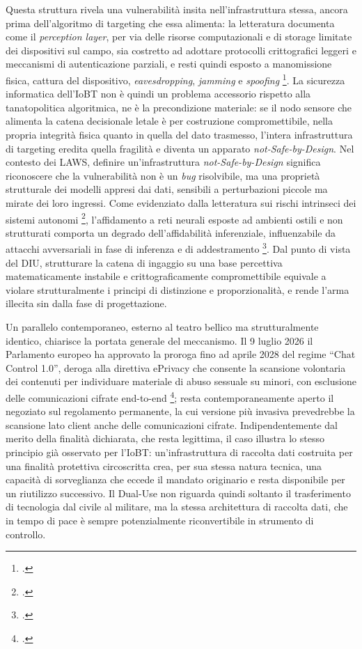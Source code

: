 \ifstampa\documentclass[a4paper,12pt,twoside,openright]{report}\else\documentclass[a4paper,12pt]{report}\fi
\newif\ifrevisione \revisionefalse
\DeclareRobustCommand{\rev}[1]{\ifrevisione{\color{blue!65!black}#1}\else#1\fi}
\begin{document}
Questa struttura rivela una vulnerabilità insita nell'infrastruttura stessa,
ancora prima dell'algoritmo di targeting che essa alimenta: la letteratura
documenta come il \textit{perception layer}, per via delle risorse computazionali
e di storage limitate dei dispositivi sul campo, sia costretto ad adottare
protocolli crittografici leggeri e meccanismi di autenticazione parziali, e resti
quindi esposto a manomissione fisica, cattura del dispositivo,
\textit{eavesdropping}, \textit{jamming} e \textit{spoofing}
\footcite{kufakunesu_2025_iobt}. La sicurezza informatica dell'IoBT non è quindi
un problema accessorio rispetto alla tanatopolitica algoritmica, ne è la
precondizione materiale: se il nodo sensore che alimenta la catena decisionale
letale è per costruzione compromettibile, nella propria integrità fisica quanto
in quella del dato trasmesso, l'intera infrastruttura di targeting eredita quella
fragilità e diventa un apparato \textit{not-Safe-by-Design}. Nel
contesto dei LAWS, definire un'infrastruttura \textit{not-Safe-by-Design}
significa riconoscere che la vulnerabilità non è un \textit{bug} risolvibile, ma
\rev{una proprietà strutturale dei modelli appresi dai dati, sensibili a
perturbazioni piccole ma mirate dei loro ingressi}. Come evidenziato
dalla letteratura sui rischi intrinseci dei sistemi autonomi
\footcite{podar_2025}, l'affidamento a reti neurali esposte ad ambienti ostili e
non strutturati comporta un degrado dell'affidabilità inferenziale, influenzabile
da attacchi avversariali \rev{in fase di inferenza e di addestramento}
\footcite{carlini_2017, cina_2023_poisoning}. Dal punto di vista del
\rev{DIU}, strutturare la catena di ingaggio su una base
percettiva matematicamente instabile e crittograficamente compromettibile
equivale a violare strutturalmente i principi di distinzione e proporzionalità, e
rende l'arma illecita sin dalla fase di progettazione.

Un parallelo contemporaneo, esterno al teatro bellico ma strutturalmente
identico, chiarisce la portata generale del meccanismo. Il 9 luglio 2026 il
Parlamento europeo ha approvato la proroga fino ad aprile 2028 del regime
``Chat Control 1.0'', deroga alla direttiva ePrivacy che consente la scansione
volontaria dei contenuti per individuare materiale di abuso sessuale su minori,
con esclusione delle comunicazioni cifrate end-to-end
\footcite{euronews_chatcontrol_2026}; resta contemporaneamente aperto il
negoziato sul regolamento permanente, la cui versione più invasiva prevedrebbe
la scansione lato client anche delle comunicazioni cifrate. Indipendentemente
dal merito della finalità dichiarata, che resta legittima, il caso illustra lo
stesso principio già osservato per l'IoBT: un'infrastruttura di raccolta dati
costruita per una finalità protettiva circoscritta crea, per sua stessa natura
tecnica, una capacità di sorveglianza che eccede il mandato originario e resta
disponibile per un riutilizzo successivo. Il Dual-Use non riguarda quindi
soltanto il trasferimento di tecnologia dal civile al militare, ma la stessa
architettura di raccolta dati, che in tempo di pace è sempre potenzialmente
riconvertibile in strumento di controllo.
\end{document}
